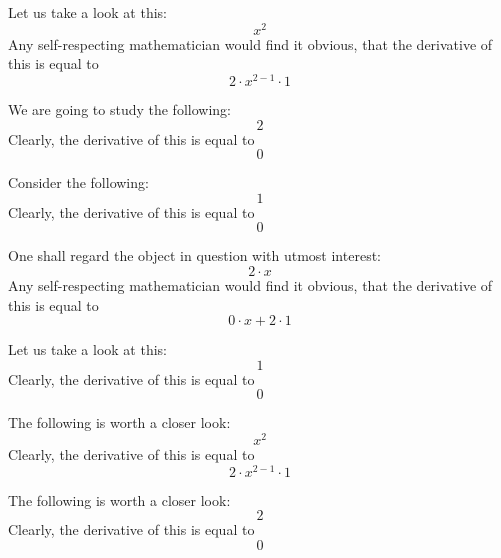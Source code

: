 \documentclass{article}
\begin{document}
Let us take a look at this:
\begin{equation}
x ^{2 } 
\end{equation}
Any self-respecting mathematician would find it obvious, that the derivative of this is equal to
\begin{equation}
2 \cdot x ^{2 - 1 } \cdot 1 
\end{equation}

We are going to study the following:
\begin{equation}
2 
\end{equation}
Clearly, the derivative of this is equal to
\begin{equation}
0 
\end{equation}

Consider the following:
\begin{equation}
1 
\end{equation}
Clearly, the derivative of this is equal to
\begin{equation}
0 
\end{equation}

One shall regard the object in question with utmost interest:
\begin{equation}
2 \cdot x 
\end{equation}
Any self-respecting mathematician would find it obvious, that the derivative of this is equal to
\begin{equation}
0 \cdot x + 2 \cdot 1 
\end{equation}

Let us take a look at this:
\begin{equation}
1 
\end{equation}
Clearly, the derivative of this is equal to
\begin{equation}
0 
\end{equation}

The following is worth a closer look:
\begin{equation}
x ^{2 } 
\end{equation}
Clearly, the derivative of this is equal to
\begin{equation}
2 \cdot x ^{2 - 1 } \cdot 1 
\end{equation}

The following is worth a closer look:
\begin{equation}
2 
\end{equation}
Clearly, the derivative of this is equal to
\begin{equation}
0 
\end{equation}
\end{document}
